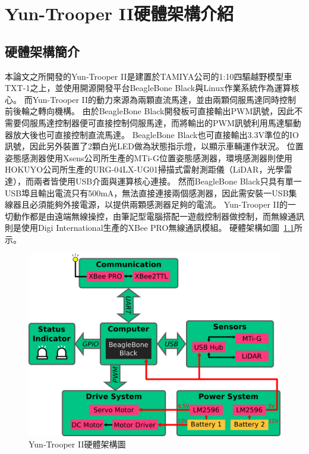 \chapter{Yun-Trooper II硬體架構介紹}
\label{c:hardware}

\section{硬體架構簡介}
本論文之所開發的Yun-Trooper II是建置於TAMIYA公司的1:10四驅越野模型車TXT-1之上，並使用開源開發平台BeagleBone Black與Linux作業系統作為運算核心。
而Yun-Trooper II的動力來源為兩顆直流馬達，並由兩顆伺服馬達同時控制前後輪之轉向機構。
由於BeagleBone Black開發板可直接輸出PWM訊號，因此不需要伺服馬達控制器便可直接控制伺服馬達，而將輸出的PWM訊號利用馬達驅動器放大後也可直接控制直流馬達。
BeagleBone Black也可直接輸出3.3V準位的IO訊號，因此另外裝置了2顆白光LED做為狀態指示燈，以顯示車輛運作狀況。
位置姿態感測器使用Xsens公司所生產的MTi-G位置姿態感測器，環境感測器則使用HOKUYO公司所生產的URG-04LX-UG01掃描式雷射測距儀（LiDAR，光學雷達），而兩者皆使用USB介面與運算核心連接。
然而BeagleBone Black只具有單一USB埠且輸出電流只有500mA，無法直接連接兩個感測器，因此需安裝一USB集線器且必須能夠外接電源，以提供兩顆感測器足夠的電流。
Yun-Trooper II的一切動作都是由遠端無線操控，由筆記型電腦搭配一遊戲控制器做控制，而無線通訊則是使用Digi International生產的XBee PRO無線通訊模組。
硬體架構如圖~\ref{f:hardware_structure}所示。

\begin{figure}[h!]
	\centering
	\includegraphics[width=\textwidth]{figures/HardwareStructure}
	\caption{Yun-Trooper II硬體架構圖}
	\label{f:hardware_structure}
\end{figure}

